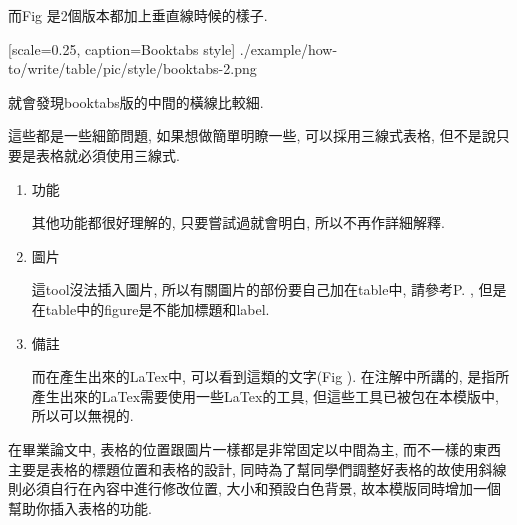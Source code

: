   而Fig 是2個版本都加上垂直線時候的樣子.

    {
      [scale=0.25,
      caption={Booktabs style}]
      {./example/how-to/write/table/pic/style/booktabs-2.png}
    }

  就會發現booktabs版的中間的橫線比較細.

  這些都是一些細節問題, 如果想做簡單明瞭一些, 可以採用三線式表格, 但不是說只要是表格就必須使用三線式.

{}

  \begin{enumerate}

  \item
  {
    功能

    其他功能都很好理解的, 只要嘗試過就會明白, 所以不再作詳細解釋.
  } %

  \item
  {
    圖片

    這tool沒法插入圖片, 所以有關圖片的部份要自己加在table中, 請參考P. , 但是在table中的figure是不能加標題和label.
  } %

  \item
  {
    備註

    而在產生出來的LaTex中, 可以看到這類的文字(Fig ). 在注解中所講的, 是指所產生出來的LaTex需要使用一些LaTex的工具, 但這些工具已被包在本模版中, 所以可以無視的.

  } %
  \end{enumerate}

\newpage
{}

在畢業論文中, 表格的位置跟圖片一樣都是非常固定以中間為主, 而不一樣的東西主要是表格的標題位置和表格的設計, 同時為了幫同學們調整好表格的故使用斜線則必須自行在內容中進行修改位置, 大小和預設白色背景, 故本模版同時增加一個幫助你插入表格的功能.\\

